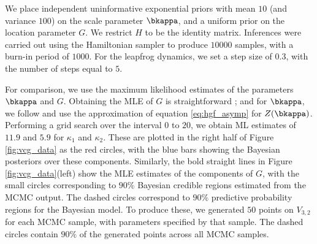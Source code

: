 
We place independent uninformative exponential priors with mean $10$ (and variance $100$) on the scale parameter $\bkappa$, and a uniform prior on the location
parameter $G$. We restrict $H$ to be the identity matrix. Inferences were carried out using the Hamiltonian sampler to produce $10000$ samples, with a
burn-in period of $1000$. For the leapfrog dynamics, we set a step size of $0.3$, with the number of steps equal to $5$.

For comparison, we use the maximum likelihood estimates of the parameters $\bkappa$ and $G$. Obtaining the MLE of
$G$ is straightforward \citep{khatri1977}; %
and for $\bkappa$,
we follow \cite{khatri1977} and use the approximation of equation \eqref{eq:hgf_asymp} for $Z(\bkappa)$. Performing a grid search over the interval
$0$ to $20$, we obtain ML estimates of %
$11.9$ and $5.9$ for $\kappa_1$ and $\kappa_2$. These are plotted in the right half of Figure \ref{fig:vcg_data} as the red circles, with the blue bars showing the
Bayesian posteriors over these components.
Similarly, the bold straight lines in Figure \ref{fig:vcg_data}(left) show the MLE estimates of the components of $G$, with the small
circles corresponding to $90\%$ Bayesian credible regions
estimated from the MCMC output.
The dashed circles correspond to $90\%$ predictive probability regions for the Bayesian model. To produce these, we generated  $50$ points on $V_{3,2}$ for each MCMC sample,
with parameters specified by that sample. The dashed circles contain $90\%$ of the generated points across all MCMC samples.


